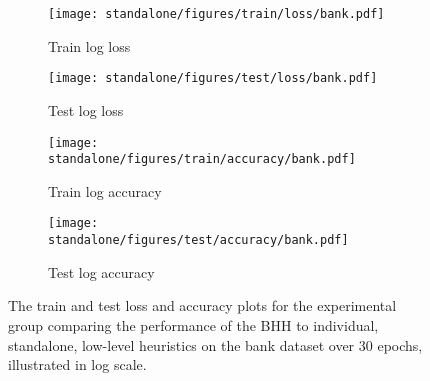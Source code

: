 \begin{figure}[htbp]
	\begin{subfigure}{0.5\textwidth}
		\centering
		\texttt{[image: standalone/figures/train/loss/bank.pdf]}
		\caption{Train log loss}
		\label{fig:results:standalone:figures:loss:train:bank}
	\end{subfigure}
	\begin{subfigure}{0.5\textwidth}
		\centering
		\texttt{[image: standalone/figures/test/loss/bank.pdf]}
		\caption{Test log loss}
		\label{fig:results:standalone:figures:loss:test:bank}
	\end{subfigure}
	\par\bigskip
	\begin{subfigure}{0.5\textwidth}
		\centering
		\texttt{[image: standalone/figures/train/accuracy/bank.pdf]}
		\caption{Train log accuracy}
		\label{fig:results:standalone:figures:accuracy:train:bank}
	\end{subfigure}
	\begin{subfigure}{0.5\textwidth}
		\centering
		\texttt{[image: standalone/figures/test/accuracy/bank.pdf]}
		\caption{Test log accuracy}
		\label{fig:results:standalone:figures:accuracy:test:bank}
	\end{subfigure}
	\par\bigskip
	\caption{The train and test loss and accuracy plots for the experimental group comparing the performance of the \acs{BHH} to individual, standalone, low-level heuristics on the bank dataset over 30 epochs, illustrated in log scale.}
	\label{fig:results:standalone:figures:bank}
\end{figure}

